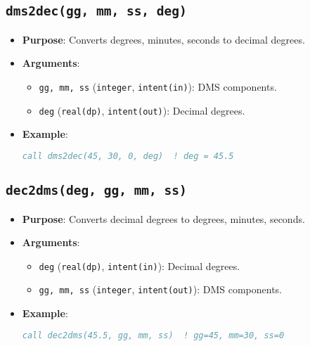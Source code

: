 \documentclass[12pt,a4paper]{report}
\begin{document}
\subsection{\texttt{dms2dec(gg, mm, ss, deg)}}
\begin{itemize}
\item \textbf{Purpose}: Converts degrees, minutes, seconds to decimal degrees.
\item \textbf{Arguments}:
\begin{itemize}
\item \texttt{gg, mm, ss} (\texttt{integer}, \texttt{intent(in)}): DMS components.
\item \texttt{deg} (\texttt{real(dp)}, \texttt{intent(out)}): Decimal degrees.
\end{itemize}
\item \textbf{Example}:
\begin{lstlisting}[language=Fortran]
call dms2dec(45, 30, 0, deg)  ! deg = 45.5
\end{lstlisting}
\end{itemize}

\subsection{\texttt{dec2dms(deg, gg, mm, ss)}}
\begin{itemize}
\item \textbf{Purpose}: Converts decimal degrees to degrees, minutes, seconds.
\item \textbf{Arguments}:
\begin{itemize}
\item \texttt{deg} (\texttt{real(dp)}, \texttt{intent(in)}): Decimal degrees.
\item \texttt{gg, mm, ss} (\texttt{integer}, \texttt{intent(out)}): DMS components.
\end{itemize}
\item \textbf{Example}:
\begin{lstlisting}[language=Fortran]
call dec2dms(45.5, gg, mm, ss)  ! gg=45, mm=30, ss=0
\end{lstlisting}
\end{itemize}
\end{document}
